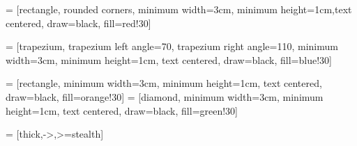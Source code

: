 \documentclass{article}
\begin{document}
\usetikzlibrary{shapes.geometric, arrows}

 = [rectangle, rounded corners, minimum width=3cm, minimum height=1cm,text centered,
draw=black, fill=red!30]

 = [trapezium, trapezium left angle=70, trapezium right angle=110, minimum width=3cm, minimum
height=1cm, text centered, draw=black, fill=blue!30]

 = [rectangle, minimum width=3cm, minimum height=1cm, text centered, draw=black, fill=orange!30]
 = [diamond, minimum width=3cm, minimum height=1cm, text centered, draw=black, fill=green!30]

 = [thick,->,>=stealth]

\end{document}
